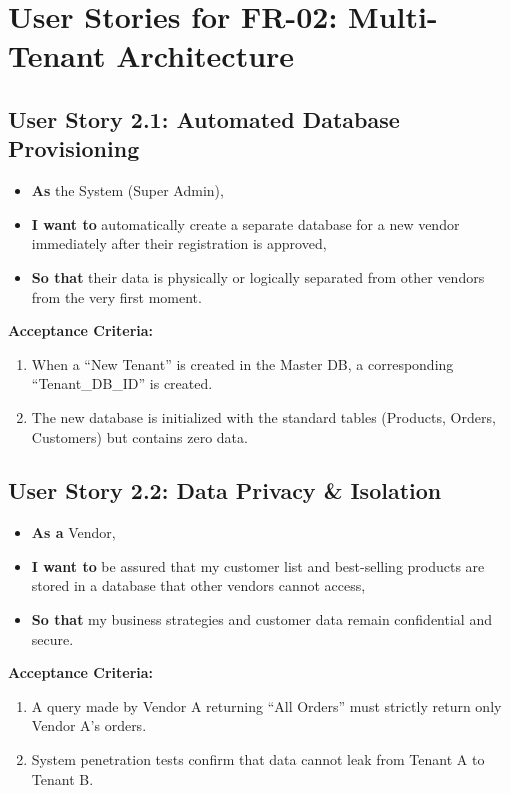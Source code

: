 \section*{User Stories for FR-02: Multi-Tenant Architecture}

\subsection*{User Story 2.1: Automated Database Provisioning}
\begin{itemize}
    \item \textbf{As} the System (Super Admin),
    \item \textbf{I want to} automatically create a separate database for a new vendor immediately after their registration is approved,
    \item \textbf{So that} their data is physically or logically separated from other vendors from the very first moment.
\end{itemize}

\noindent\textbf{Acceptance Criteria:}
\begin{enumerate}
    \item When a ``New Tenant'' is created in the Master DB, a corresponding ``Tenant\_DB\_ID'' is created.
    \item The new database is initialized with the standard tables (Products, Orders, Customers) but contains zero data.
\end{enumerate}

\vspace{1em}
\subsection*{User Story 2.2: Data Privacy \& Isolation}
\begin{itemize}
    \item \textbf{As a} Vendor,
    \item \textbf{I want to} be assured that my customer list and best-selling products are stored in a database that other vendors cannot access,
    \item \textbf{So that} my business strategies and customer data remain confidential and secure.
\end{itemize}

\noindent\textbf{Acceptance Criteria:}
\begin{enumerate}
    \item A query made by Vendor A returning ``All Orders'' must strictly return only Vendor A's orders.
    \item System penetration tests confirm that data cannot leak from Tenant A to Tenant B.
\end{enumerate}

